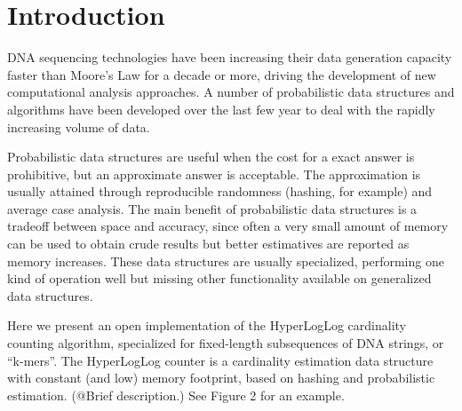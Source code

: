 \documentclass{bioinfo}
\begin{document}

\section{Introduction}

DNA sequencing technologies have been increasing their data generation
capacity faster than Moore's Law for a decade or more, driving the
development of new computational analysis approaches.  A number of
probabilistic data structures and algorithms have been developed over
the last few year to deal with the rapidly increasing volume of data.

Probabilistic data structures are useful when the cost for a exact
answer is prohibitive, but an approximate answer is acceptable.  The
approximation is usually attained through reproducible randomness
(hashing, for example) and average case analysis.  The main benefit of
probabilistic data structures is a tradeoff between space and
accuracy, since often a very small amount of memory can be used to obtain
crude results but better estimatives are reported as memory increases.
These data structures are usually specialized, performing one kind of
operation well but missing other functionality available on
generalized data structures.

Here we present an open implementation of the HyperLogLog cardinality
counting algorithm, specialized for fixed-length subsequences of DNA
strings, or ``k-mers''.  The HyperLogLog counter is a cardinality
estimation data structure with constant (and low) memory footprint,
based on hashing and probabilistic estimation.  (@Brief description.)
See Figure 2 for an example.
\end{document}

